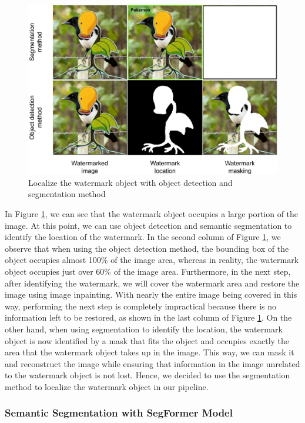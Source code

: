 \begin{figure}[t]
    \centering
    \includegraphics[width=0.8\linewidth]{img/od-segmentation-compare.png}
    \caption{Localize the watermark object with object detection and segmentation method}
    \label{fig:localize-compare-OD-segment}
\end{figure}

In Figure \ref{fig:localize-compare-OD-segment}, we can see that the watermark object occupies a large portion of the image. At this point, we can use object detection and semantic segmentation to identify the location of the watermark. In the second column of Figure \ref{fig:localize-compare-OD-segment}, we observe that when using the object detection method, the bounding box of the object occupies almost 100\% of the image area, whereas in reality, the watermark object occupies just over 60\% of the image area. Furthermore, in the next step, after identifying the watermark, we will cover the watermark area and restore the image using image inpainting. With nearly the entire image being covered in this way, performing the next step is completely impractical because there is no information left to be restored, as shown in the last column of Figure \ref{fig:localize-compare-OD-segment}. On the other hand, when using segmentation to identify the location, the watermark object is now identified by a mask that fits the object and occupies exactly the area that the watermark object takes up in the image. This way, we can mask it and reconstruct the image while ensuring that information in the image unrelated to the watermark object is not lost. Hence, we decided to use the segmentation method to localize the watermark object in our pipeline.

\subsubsection{Semantic Segmentation with SegFormer Model}

